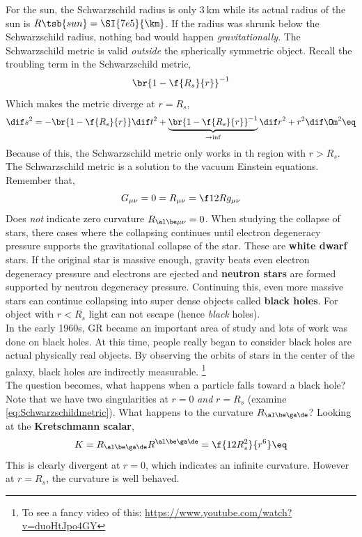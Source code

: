 \documentclass{article}
\begin{document}
For the sun, the Schwarzschild radius is only $\SI{3}{\km}$ while its actual radius of the sun is $R\tsb{sun} = \SI{7e5}{\km}$. If the radius was shrunk below the Schwarzschild radius, nothing bad would happen \textit{gravitationally}. The Schwarzschild metric is valid \textit{outside} the spherically symmetric object. Recall the troubling term in the Schwarzschild metric,
\[ \br{1 - \f{R_s}{r}}^{-1} \]
Which makes the metric diverge at $r = R_s$,
\[ \dif s^2 = -\br{1 - \f{R_s}{r}} \dif t^2 + \underbrace{\br{1 - \f{R_s}{r}}^{-1}}_{\to \inf } \dif r^2 + r^2 \dif \Om^2 \eq \label{eq:Schwarzschildmetric} \]
Because of this, the Schwarzschild metric only works in th region with $r > R_s$. The Schwarzschild metric is a solution to the vacuum Einstein equations. Remember that,
\[ G_{\mu\nu} = 0 = R_{\mu\nu} = \f12 R g_{\mu\nu} \]
Does \textit{not} indicate zero curvature $R_{\al\be\mu\nu} = 0$. When studying the collapse of stars, there cases where the collapsing continues until electron degeneracy pressure supports the gravitational collapse of the star. These are \textbf{white dwarf} stars. If the original star is massive enough, gravity beats even electron degeneracy pressure and electrons are ejected and \textbf{neutron stars} are formed supported by neutron degeneracy pressure. Continuing this, even more massive stars can continue collapsing into super dense objects called \textbf{black holes}. For object with $r < R_s$ light can not escape (hence \textit{black} holes). \\

In the early 1960s, GR became an important area of study and lots of work was done on black holes. At this time, people really began to consider black holes are actual physically real objects. By observing the orbits of stars in the center of the galaxy, black holes are indirectly measurable. \footnote{To see a fancy video of this: \url{https://www.youtube.com/watch?v=duoHtJpo4GY}} \\

The question becomes, what happens when a particle falls toward a black hole? Note that we have two singularities at $r = 0$ \textit{and} $r = R_s$ (examine \eqref{eq:Schwarzschildmetric}). What happens to the curvature $R_{\al\be\ga\de}$? Looking at the \textbf{Kretschmann scalar},
\[ K = R_{\al\be\ga\de}R^{\al\be\ga\de} = \f{12R_s^2}{r^6} \eq \label{eq:KretschmannScalar} \]
This is clearly divergent at $r = 0$, which indicates an infinite curvature. However at $r = R_s$, the curvature is well behaved.
\end{document}
